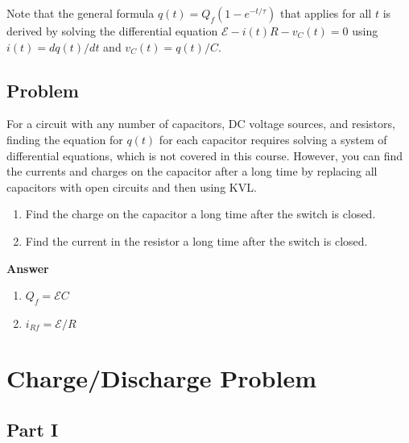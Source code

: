 \documentclass{article}
\begin{document}
Note that the general formula $q(t)=Q_f(1-e^{-t/\tau})$ that applies for all $t$ is derived by solving the differential equation $\mathcal{E}-i(t)R-v_C(t)=0$ using $i(t)=dq(t)/dt$ and $v_C(t)=q(t)/C$.

\ifsolutions

\else

\newpage
\fi
\ifsolutions\else
\newpage
\fi

\subsection{Problem}

For a circuit with any number of capacitors, DC voltage sources, and resistors, finding the equation for $q(t)$ for each capacitor requires solving a system of differential equations, which is not covered in this course. However, you can find the currents and charges on the capacitor after a long time by replacing all capacitors with open circuits and then using KVL.



\begin{enumerate}

  \item Find the charge on the capacitor a long time after the switch is closed.

  \item Find the current in the resistor a long time after the switch is closed.

\end{enumerate}

\ifsolutions
\textbf{Answer}

    \begin{enumerate}

      \item $Q_f=\mathcal{E}C$

      \item $i_{Rf}=\mathcal{E}/R$

    \end{enumerate}
\else

\fi
\ifsolutions\else

\fi

\newpage

\section{Charge/Discharge Problem}

\subsection{Part I}
\end{document}
